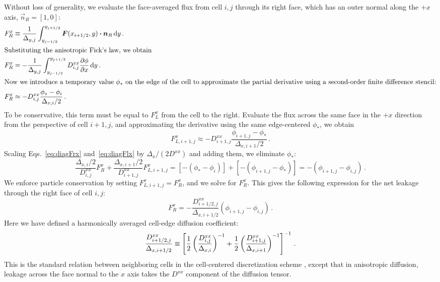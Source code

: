 Without loss of generality, we evaluate the face-averaged flux from cell
$i,j$ through its right face, which has an outer normal along the $+x$ axis,
$\vec{n}_R = [1,0]$:
\begin{align} \nonumber
  F_R^x &\equiv \frac{1}{\Delta_{y,j}} \int_{y_{j-1/2}}^{y_{j+1/2}}
  \bm{F}(x_{i+1/2}, y) \bm{\cdot} \bm{n}_R \mathop{}\!\mathrm{d} y\,.
  \\
  \intertext{Substituting the anisotropic Fick's law, we obtain} \nonumber
  F_R^x &= - \frac{1}{\Delta_{y,j}} \int_{y_{j-1/2}}^{y_{j+1/2}}
  D_{i,j}^{xx} \frac{\partial \phi}{\partial x} \mathop{}\!\mathrm{d} y \,.
  \\ 
  \intertext{Now we introduce a temporary value $\phi_*$ on the edge of the cell
    to
  approximate the partial derivative using a second-order finite difference
  stencil:}
  \label{eq:diagFrx}
  F_R^x &\approx - 
  D_{i,j}^{xx} \frac{\phi_* - \phi_{i}}{\Delta_{x,i}/2} \,.
\end{align}
To be conservative, this term must be equal to $F_L^x$ from the cell to
the right. Evaluate the flux across the same face in the $+x$ direction
from the perspective of cell $i+1,j$, and approximating the derivative using the
same edge-centered $\phi_*$, we obtain
\begin{equation}\label{eq:diagFlx}
  F_{L,i+1,j}^x \approx - 
  D_{i+1,j}^{xx} \frac{\phi_{i+1,j} - \phi_*}{\Delta_{x,i+1}/2} \,.
\end{equation}
Scaling Eqs.~\eqref{eq:diagFrx} and~\eqref{eq:diagFlx} by $\Delta_x/(2 D^{xx})$
and adding them, we eliminate $\phi_*$:
\begin{equation*}
  \frac{\Delta_{x,i}/2}{D_{i,j}^{xx}}F_R^x
 + \frac{\Delta_{x,i+1}/2}{D_{i+1,j}^{xx}}F_{L,i+1,j}^x
 = \left[ -(\phi_* - \phi_{i}) \right] + \left[ -(\phi_{i+1,j} - \phi_*)
   \right]
   = -\left( \phi_{i+1,j} - \phi_{i,j} \right) \,.
\end{equation*}
We enforce particle conservation by setting $F_{L,i+1,j}^x = F_R^x$, and we
solve for $F_R^x$. This
gives the following expression for the net leakage through the right face of
cell $i,j$:
\begin{equation}\label{eq:diagF}
  F_R^x= -\frac{D^{xx}_{i+1/2,j}}{\Delta_{x,i+1/2}}
  \left( \phi_{i+1,j} - \phi_{i,j} \right)\,.
\end{equation}
Here we have defined a harmonically averaged cell-edge diffusion coefficient:
\begin{equation} \label{eq:cellEdgeDHarmonic}
  \frac{D^{xx}_{i+1/2,j}}{\Delta_{x,i+1/2}} \equiv \left[
  \frac12 \left( \frac{D^{xx}_{i,j}}{\Delta_{x,i}} \right)^{-1}
 + \frac12 \left( \frac{D^{xx}_{i+1,j}}{\Delta_{x,i+1}} \right)^{-1}
  \right]^{-1}\,.
\end{equation}
This is the standard relation between neighboring cells in the
cell-centered discretization scheme \cite{Dud1976}, except that in anisotropic
diffusion, leakage across the face normal to the $x$ axis takes the $D^{xx}$
component of the diffusion tensor.

